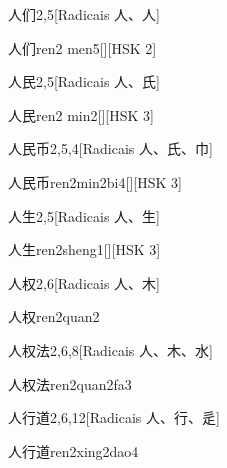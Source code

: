 \begin{entry}{人们}{2,5}[Radicais ⼈、⼈]
  \begin{phonetics}{人们}{ren2 men5}[][HSK 2]
  \end{phonetics}
\end{entry}

\begin{entry}{人民}{2,5}[Radicais ⼈、⽒]
  \begin{phonetics}{人民}{ren2 min2}[][HSK 3]
  \end{phonetics}
\end{entry}

\begin{entry}{人民币}{2,5,4}[Radicais ⼈、⽒、⼱]
  \begin{phonetics}{人民币}{ren2min2bi4}[][HSK 3]
  \end{phonetics}
\end{entry}

\begin{entry}{人生}{2,5}[Radicais ⼈、⽣]
  \begin{phonetics}{人生}{ren2sheng1}[][HSK 3]
  \end{phonetics}
\end{entry}

\begin{entry}{人权}{2,6}[Radicais ⼈、⽊]
  \begin{phonetics}{人权}{ren2quan2}
  \end{phonetics}
\end{entry}

\begin{entry}{人权法}{2,6,8}[Radicais ⼈、⽊、⽔]
  \begin{phonetics}{人权法}{ren2quan2fa3}
  \end{phonetics}
\end{entry}

\begin{entry}{人行道}{2,6,12}[Radicais ⼈、⾏、⾡]
  \begin{phonetics}{人行道}{ren2xing2dao4}
  \end{phonetics}
\end{entry}

